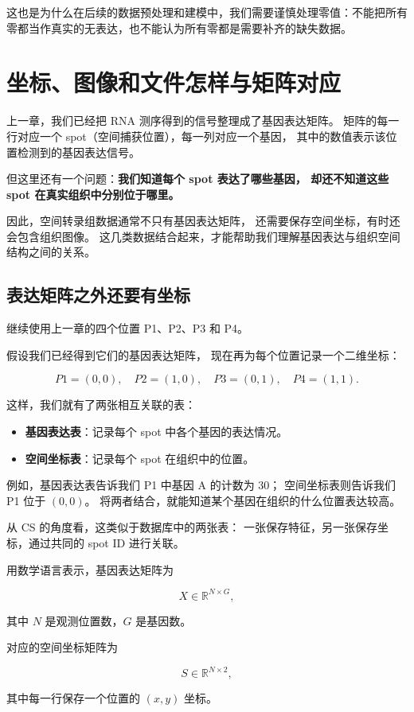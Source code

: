 \documentclass[UTF8,a4paper,11pt,fontset=fandol]{ctexart}
\newcommand{\chapterstart}[1]{\clearpage\section{#1}}
\begin{document}
这也是为什么在后续的数据预处理和建模中，我们需要谨慎处理零值：不能把所有零都当作真实的无表达，也不能认为所有零都是需要补齐的缺失数据。




\chapterstart{坐标、图像和文件怎样与矩阵对应}

上一章，我们已经把 RNA 测序得到的信号整理成了基因表达矩阵。
矩阵的每一行对应一个 spot（空间捕获位置），每一列对应一个基因，
其中的数值表示该位置检测到的基因表达信号。

但这里还有一个问题：\textbf{我们知道每个 spot 表达了哪些基因，
却还不知道这些 spot 在真实组织中分别位于哪里。}

因此，空间转录组数据通常不只有基因表达矩阵，
还需要保存空间坐标，有时还会包含组织图像。
这几类数据结合起来，才能帮助我们理解基因表达与组织空间结构之间的关系。

\subsection{表达矩阵之外还要有坐标}

继续使用上一章的四个位置 P1、P2、P3 和 P4。

假设我们已经得到它们的基因表达矩阵，
现在再为每个位置记录一个二维坐标：

\[
  P1=(0,0),\quad P2=(1,0),\quad
  P3=(0,1),\quad P4=(1,1).
\]

这样，我们就有了两张相互关联的表：

\begin{itemize}
  \item \textbf{基因表达表}：记录每个 spot 中各个基因的表达情况。
  \item \textbf{空间坐标表}：记录每个 spot 在组织中的位置。
\end{itemize}

例如，基因表达表告诉我们 P1 中基因 A 的计数为 30；
空间坐标表则告诉我们 P1 位于 $(0,0)$。
将两者结合，就能知道某个基因在组织的什么位置表达较高。

从 CS 的角度看，这类似于数据库中的两张表：
一张保存特征，另一张保存坐标，通过共同的 spot ID 进行关联。

用数学语言表示，基因表达矩阵为

\[
X\in\mathbb{R}^{N\times G},
\]

其中 $N$ 是观测位置数，$G$ 是基因数。

对应的空间坐标矩阵为

\[
S\in\mathbb{R}^{N\times 2},
\]

其中每一行保存一个位置的 $(x,y)$ 坐标。
\end{document}
